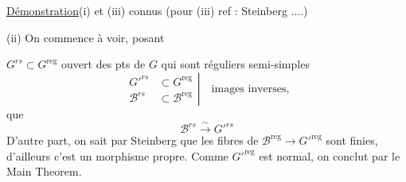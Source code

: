 \uline{Démonstration}\quad (i) et (iii) connus (pour (iii) ref : Steinberg ....)

(ii) On commence à voir, posant 

$G^{rs}\subset G^{\mathrm{reg}}$ ouvert des pts de $G$ qui sont réguliers semi-simples
\[
\left.\begin{aligned}
G'^{rs}&\subset G^{\mathrm{reg}}\\
\mathscr B^{rs}&\subset\mathscr B^{\mathrm{reg}}
\end{aligned}\right|\quad\text{images inverses,}
\]
que
\[
\mathscr B^{rs}\xrightarrow{\sim} G'^{rs}
\]
D'autre part, on sait par Steinberg que les fibres de $\mathscr B^{\mathrm{reg}}\longrightarrow G'^{\mathrm{reg}}$ sont finies, d'ailleurs c'est un morphisme propre. Comme $G'^{\mathrm{reg}}$ est normal, on conclut par le Main Theorem.
